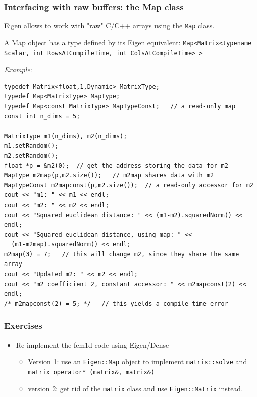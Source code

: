\documentclass[smaller,a4paper]{beamer}
\newcommand{\cpp}[1]{\lstinline!#1!}
\begin{document}
\begin{frame}
\frametitle{Interfacing with raw buffers: the Map class}
Eigen allows to work with "raw" C/C++ arrays using the
 \cpp{Map} class.

A Map object has a type defined by its Eigen equivalent:
\cpp{Map<Matrix<typename Scalar, int RowsAtCompileTime, int ColsAtCompileTime> >}

\null

\emph{Example}:
\begin{lstlisting}
typedef Matrix<float,1,Dynamic> MatrixType;
typedef Map<MatrixType> MapType;
typedef Map<const MatrixType> MapTypeConst;   // a read-only map
const int n_dims = 5;
  
MatrixType m1(n_dims), m2(n_dims);
m1.setRandom();
m2.setRandom();
float *p = &m2(0);  // get the address storing the data for m2
MapType m2map(p,m2.size());   // m2map shares data with m2
MapTypeConst m2mapconst(p,m2.size());  // a read-only accessor for m2
cout << "m1: " << m1 << endl;
cout << "m2: " << m2 << endl;
cout << "Squared euclidean distance: " << (m1-m2).squaredNorm() << endl;
cout << "Squared euclidean distance, using map: " <<
  (m1-m2map).squaredNorm() << endl;
m2map(3) = 7;   // this will change m2, since they share the same array
cout << "Updated m2: " << m2 << endl;
cout << "m2 coefficient 2, constant accessor: " << m2mapconst(2) << endl;
/* m2mapconst(2) = 5; */   // this yields a compile-time error
\end{lstlisting}

\end{frame}

\begin{frame}\frametitle{Exercises}
\begin{itemize}
\item Re-implement the fem1d code using Eigen/Dense
\begin{itemize}
\item Version 1: use an \cpp{Eigen::Map} object to implement 
\cpp{matrix::solve} and \cpp{matrix operator* (matrix&, matrix&)}
\item version 2: get rid of the \cpp{matrix} class and use \cpp{Eigen::Matrix} instead.
\end{itemize}
\end{itemize}
\end{frame}
\end{document}
